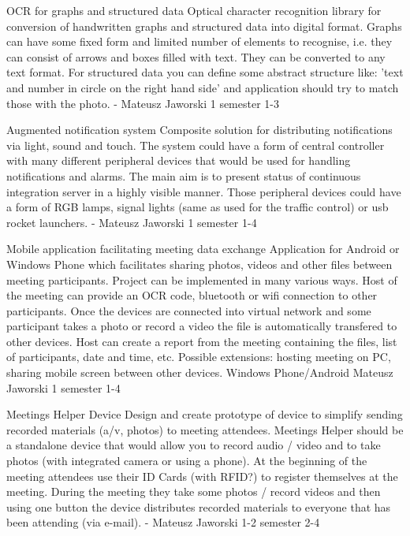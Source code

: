 \begin{project}
{OCR for graphs and structured data}
{Optical character recognition library for conversion of handwritten graphs and structured data into digital format.} 
{ 
Graphs can have some fixed form and limited number of elements to recognise, i.e. 
they can consist of arrows and boxes filled with text. They can be converted to any text format.
 For structured data you can define some abstract structure like: 'text and
 number in circle on the right hand side' and application should try to match
 those with the photo.
}
{-}
{Mateusz Jaworski}
{1 semester}
{1-3}
\end{project}
\begin{project}
{Augmented notification system}
{Composite solution for distributing notifications via light, sound and touch.}
{
The system could have a form of central controller with many different 
peripheral devices that would be used for handling notifications and alarms. 
The main aim is to present status of continuous integration server in a highly visible manner. 
Those peripheral devices could have a form of RGB lamps, signal lights (same as used for the traffic control) or usb rocket launchers.
}
{-}
{Mateusz Jaworski}
{1 semester}
{1-4}
\end{project}
\begin{project}
{Mobile application facilitating meeting data exchange}
{Application for Android or Windows Phone which facilitates sharing photos,
videos and other files between meeting participants.} 
{
Project can be implemented in many various ways. Host of the meeting can
provide an OCR code, bluetooth or wifi connection to other participants. Once
the devices are connected into virtual network and some participant takes a
photo or record a video the file is automatically transfered to other devices.
Host can create a report from the meeting containing the files, list of
participants, date and time, etc. Possible extensions: hosting meeting on PC,
sharing mobile screen between other devices.}
{Windows Phone/Android}
{Mateusz Jaworski}
{1 semester}
{1-4}
\end{project}
\begin{project}
{Meetings Helper Device}
{Design and create prototype of device to simplify sending recorded materials
(a/v, photos) to meeting attendees.} {
Meetings Helper should be a standalone device that would allow you to record audio / video 
and to take photos (with integrated camera or using a phone). At the beginning of the meeting 
attendees use their ID Cards (with RFID?) to register themselves at the meeting. 
During the meeting they take some photos / record videos and then using one button 
the device distributes recorded materials to everyone that has been attending (via e-mail). }
{-}
{Mateusz Jaworski}
{1-2 semester}
{2-4}
\end{project}
